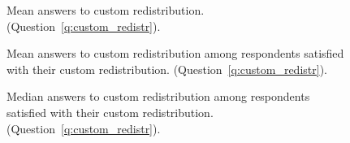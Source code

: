 \begin{figure}[h!]
    \caption[Average answers to custom redistribution]{Mean answers to custom redistribution. (Question~\ref{q:custom_redistr}).
    }\label{fig:custom_redistr_most}
\end{figure} 

\begin{figure}[h!]
    \caption[Average answers to custom redistribution among satisfied]{Mean answers to custom redistribution among respondents satisfied with their custom redistribution. (Question~\ref{q:custom_redistr}).
    }\label{fig:custom_redistr_satisfied_mean}
\end{figure} 

\begin{figure}[h!]
    \caption[Median answers to custom redistribution among satisfied]{Median answers to custom redistribution among respondents satisfied with their custom redistribution. (Question~\ref{q:custom_redistr}).
    }\label{fig:custom_redistr_satisfied_median}
\end{figure} 

